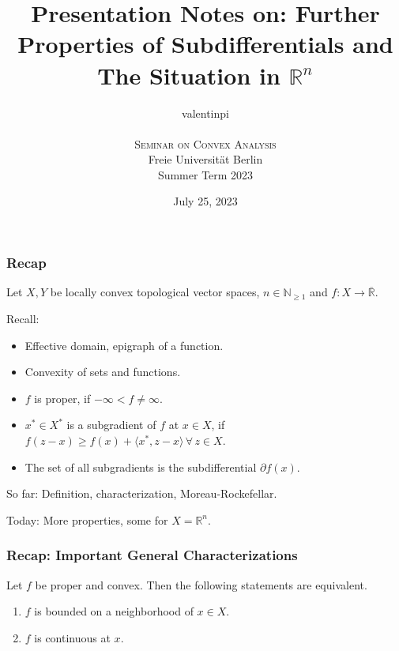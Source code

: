 \documentclass[10pt, hyperref={hidelinks}]{beamer}
\title{Presentation Notes on: Further Properties of Subdifferentials and The Situation in \(\mathbb{R}^n\)}
\author{valentinpi\\\phantom{}\\\textsc{Seminar on Convex Analysis}\\Freie Universität Berlin\\Summer Term 2023}
\date{July 25, 2023}
\begin{document}
    \frame{\titlepage}

    \begin{frame}
        \frametitle{Recap}

        \pause
    
        Let \(X, Y\) be locally convex topological vector spaces, \(n \in \mathbb{N}_{\geq 1}\) and \(f\colon X \to \overline{\mathbb{R}}\).

        \pause
        Recall:
        \begin{itemize}
            \item Effective domain, epigraph of a function.
            \pause
            \item Convexity of sets and functions.
            \pause
            \item \(f\) is proper, if \(-\infty < f \neq \infty\).
            \pause
            \item \(x^* \in X^*\) is a subgradient of \(f\) at \(x \in X\), if \(f(z-x) \geq f(x) + \langle x^*, z-x \rangle \, \forall \, z \in X\).
            \pause
            \item The set of all subgradients is the subdifferential \(\partial f(x)\).
        \end{itemize}
        \pause
        So far: Definition, characterization, Moreau-Rockefellar.
        
        \pause
        Today: More properties, some for \(X = \mathbb{R}^n\).
    \end{frame}

    \begin{frame}
        \frametitle{Recap: Important General Characterizations}

        \begin{theorem} \label{proper_convex_continuity_boundedness_equivalence}
            Let \(f\) be proper and convex. Then the following statements are equivalent.
            \begin{enumerate}[label=(\roman*), wide]
                \item \(f\) is bounded on a neighborhood of \(x \in X\).
                \item \(f\) is continuous at \(x\).
            \end{enumerate}
        \end{theorem}
    \end{frame}
\end{document}
